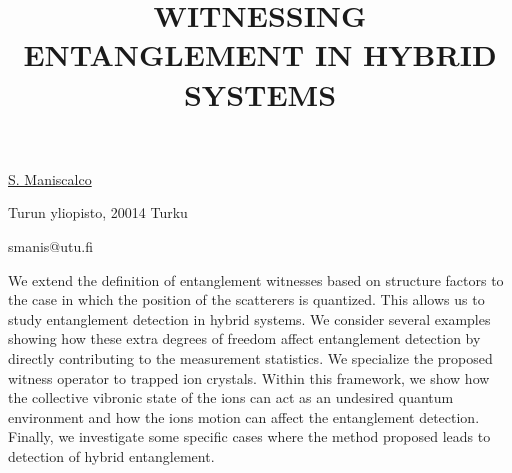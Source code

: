 \title{WITNESSING ENTANGLEMENT IN HYBRID SYSTEMS}

\underline{S. Maniscalco} 

{\normalsize{\vspace{-4mm}
Turun yliopisto, 20014 Turku

\email smanis@utu.fi}}

We extend the definition of entanglement witnesses based on structure factors to the case in which the position
of the scatterers is quantized. This allows us to study entanglement detection in hybrid systems.
We consider several examples showing how these extra degrees of freedom affect entanglement detection by directly contributing to
the measurement statistics.
We specialize the proposed witness operator to trapped ion crystals. Within this framework, we show how the collective vibronic state
of the ions can act as an undesired quantum environment and how the ions motion can affect the entanglement detection.
Finally, we investigate some specific cases where the method proposed leads to detection of hybrid entanglement.

\vspace{\baselineskip}
